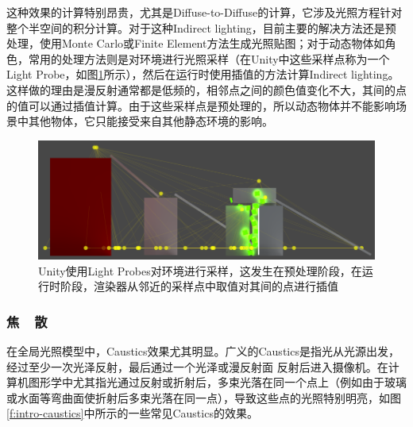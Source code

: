 这种效果的计算特别昂贵，尤其是Diffuse-to-Diffuse的计算，它涉及光照方程针对整个半空间的积分计算。对于这种Indirect lighting，目前主要的解决方法还是预处理，使用Monte Carlo或Finite Element方法生成光照贴图；对于动态物体如角色，常用的处理方法则是对环境进行光照采样（在Unity中这些采样点称为一个Light Probe，如图\ref{f:intro-light-probe}所示），然后在运行时使用插值的方法计算Indirect lighting。这样做的理由是漫反射通常都是低频的，相邻点之间的颜色值变化不大，其间的点的值可以通过插值计算。由于这些采样点是预处理的，所以动态物体并不能影响场景中其他物体，它只能接受来自其他静态环境的影响。

\begin{figure}
\includegraphics[width=1.\textwidth]{figures/intro/LightProbes}	
\caption{Unity使用Light Probes对环境进行采样，这发生在预处理阶段，在运行时阶段，渲染器从邻近的采样点中取值对其间的点进行插值}
\label{f:intro-light-probe}
\end{figure}




\subsubsection{焦~~散}
在全局光照模型中，Caustics效果尤其明显。广义的Caustics是指光从光源出发，经过至少一次光泽反射，最后通过一个光泽或漫反射面 反射后进入摄像机。在计算机图形学中尤其指光通过反射或折射后，多束光落在同一个点上（例如由于玻璃或水面等弯曲面使折射后多束光落在同一点），导致这些点的光照特别明亮，如图\ref{f:intro-caustics}中所示的一些常见Caustics的效果。


